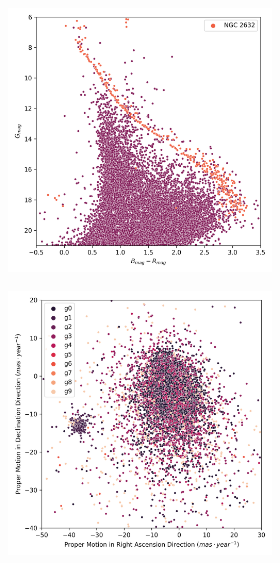 \documentclass[11pt, a4paper, english]{book}
\begin{document}
\begin{figure}[H]
\begin{subfigure}{0.9\textwidth}
\begin{subfigure}[t]{0.30\textwidth}
    \end{subfigure}
    \hfill
    \begin{subfigure}[t]{0.30\textwidth}
      \centering
      \includegraphics[width=\textwidth]{../figures/ngc_2632/hr_diagram_ngc_2632.png}
    \end{subfigure}
  \end{subfigure}
  \caption{NGC 2632 Clusterix+TOPCAT characterization.}
  \label{fig:result_ngc_2632_clusterix}
  \centering
  \begin{subfigure}{0.9\textwidth}
    \centering
    \begin{subfigure}[t]{0.30\textwidth}
      \centering
      \includegraphics[width=\textwidth]{../figures/ngc_2632/kmeans_pm_ngc_2632.png}

\end{subfigure}
\end{subfigure}
\end{figure}
\end{document}
